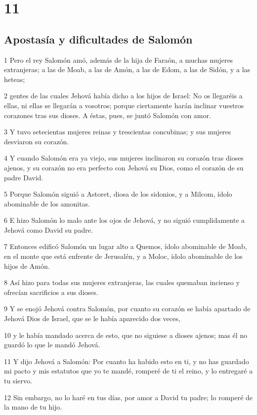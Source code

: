 \chapter{11}

\section*{Apostasía y dificultades de Salomón}

\par 1 Pero el rey Salomón amó, además de la hija de Faraón, a muchas mujeres extranjeras; a las de Moab, a las de Amón, a las de Edom, a las de Sidón, y a las heteas;
\par 2 gentes de las cuales Jehová había dicho a los hijos de Israel: No os llegaréis a ellas, ni ellas se llegarán a vosotros; porque ciertamente harán inclinar vuestros corazones tras sus dioses. A éstas, pues, se juntó Salomón con amor.
\par 3 Y tuvo setecientas mujeres reinas y trescientas concubinas; y sus mujeres desviaron su corazón.
\par 4 Y cuando Salomón era ya viejo, sus mujeres inclinaron su corazón tras dioses ajenos, y su corazón no era perfecto con Jehová su Dios, como el corazón de su padre David.
\par 5 Porque Salomón siguió a Astoret, diosa de los sidonios, y a Milcom, ídolo abominable de los amonitas.
\par 6 E hizo Salomón lo malo ante los ojos de Jehová, y no siguió cumplidamente a Jehová como David su padre.
\par 7 Entonces edificó Salomón un lugar alto a Quemos, ídolo abominable de Moab, en el monte que está enfrente de Jerusalén, y a Moloc, ídolo abominable de los hijos de Amón.
\par 8 Así hizo para todas sus mujeres extranjeras, las cuales quemaban incienso y ofrecían sacrificios a sus dioses.
\par 9 Y se enojó Jehová contra Salomón, por cuanto su corazón se había apartado de Jehová Dios de Israel, que se le había aparecido dos veces,
\par 10 y le había mandado acerca de esto, que no siguiese a dioses ajenos; mas él no guardó lo que le mandó Jehová.
\par 11 Y dijo Jehová a Salomón: Por cuanto ha habido esto en ti, y no has guardado mi pacto y mis estatutos que yo te mandé, romperé de ti el reino, y lo entregaré a tu siervo.
\par 12 Sin embargo, no lo haré en tus días, por amor a David tu padre; lo romperé de la mano de tu hijo.
